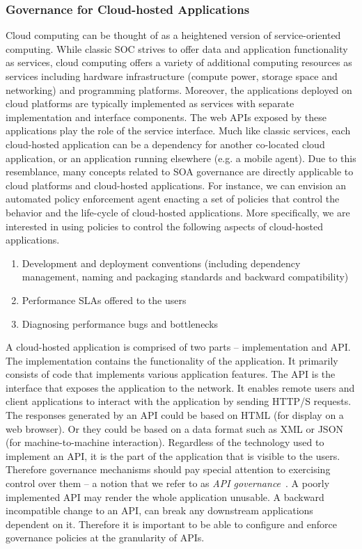 \subsubsection{Governance for Cloud-hosted Applications}
Cloud computing can be thought of as a heightened version of service-oriented computing. While classic
SOC strives to offer data and application functionality as services, cloud computing offers a variety
of additional computing resources
as services including hardware infrastructure (compute power, storage space and networking) and programming
platforms. Moreover, the applications deployed on cloud platforms are typically implemented as services with
separate implementation and interface components. The web APIs exposed by these applications play the
role of the service interface.
Much like classic services, each cloud-hosted application 
can be a dependency for another
co-located cloud application, or an application running elsewhere (e.g. a mobile agent). 
Due to this resemblance, many concepts related to SOA governance are
directly applicable to cloud platforms and cloud-hosted applications. For instance, we can envision an 
automated policy enforcement agent enacting a 
set of policies that control the behavior and the life-cycle of cloud-hosted applications.
More specifically, we are interested in using policies to control the following aspects of cloud-hosted 
applications.
\begin{enumerate}
\item Development and deployment conventions (including dependency management, naming and packaging
standards and backward compatibility)
\item Performance SLAs offered to the users
\item Diagnosing performance bugs and bottlenecks
\end{enumerate}

A cloud-hosted application is comprised of two parts -- implementation and API. The implementation
contains the functionality of the application. It primarily consists of code that implements
various application features. The API is the interface that exposes the application to the
network. It enables remote users and client applications to interact with the application by sending
HTTP/S requests. The responses generated by an API could be based on HTML (for display on a web
browser). Or they could be based on a data format such as XML or JSON (for machine-to-machine 
interaction). Regardless of the technology used to implement an API, it is the part of the application 
that is visible to the users. Therefore governance
mechanisms should pay special attention to exercising control over them -- a notion that we refer
to as \textit{API governance}~\cite{6903538}. A poorly implemented API may render the whole application unusable.
A backward incompatible change to an API, can break any downstream applications dependent on it. 
Therefore it is important to be able to configure and enforce governance policies at the granularity of
APIs.

